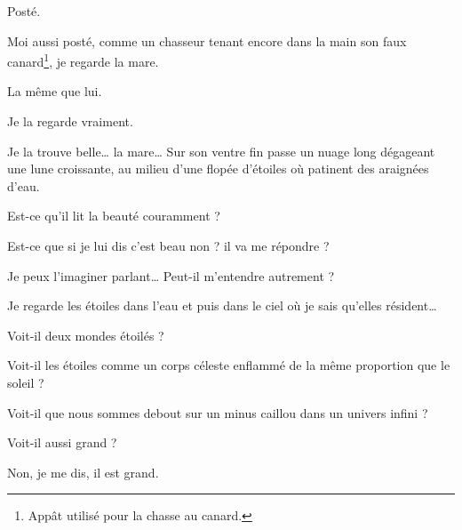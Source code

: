 {Posté.

Moi aussi posté, comme un chasseur tenant encore dans la main son faux canard\footnote{Appât utilisé pour la chasse au canard.}, 
je regarde la mare.

La même que lui.

Je la regarde vraiment.

Je la trouve belle… la mare… Sur son ventre fin passe un nuage long dégageant une lune croissante, au milieu d’une flopée d’étoiles où patinent des araignées d’eau.

Est-ce qu’il lit la beauté couramment ?

Est-ce que si je lui dis c’est beau non ? il va me répondre ?

Je peux l’imaginer parlant… Peut-il m’entendre autrement ?

Je regarde les étoiles dans l’eau et puis dans le ciel où je sais qu’elles résident…

Voit-il deux mondes étoilés ?

Voit-il les étoiles comme un corps céleste enflammé de la même proportion que le
soleil ?

Voit-il que nous sommes debout sur un minus caillou dans un univers infini ?

Voit-il aussi grand ?

Non, je me dis, il est grand.\setlength{\parskip}{6pt}
}

%

%

%
